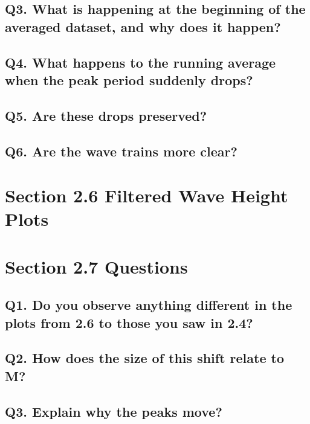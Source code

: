 \documentclass[titlepage]{scrartcl}
\begin{document}
    \subsection*{Q3. What is happening at the beginning of the averaged dataset, and why does it happen?}

    \subsection*{Q4. What happens to the running average when the peak period suddenly drops?}
    \subsection*{Q5. Are these drops preserved?}
    \subsection*{Q6. Are the wave trains more clear?}

    \section*{Section 2.6 Filtered Wave Height Plots}
    \begin{figure}[H]
    \end{figure}

    \section*{Section 2.7 Questions}
    \subsection*{Q1. Do you observe anything different in the plots from 2.6 to those you saw in 2.4?}
    \subsection*{Q2. How does the size of this shift relate to M?}
    \subsection*{Q3. Explain why the peaks move?}

\end{document}
